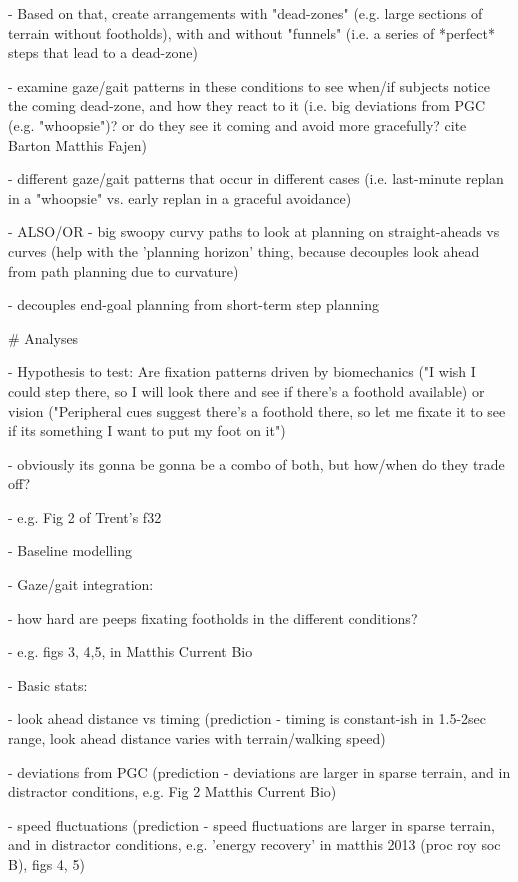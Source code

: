   - Based on that, create arrangements with "dead-zones" (e.g. large sections of terrain without footholds), with and without "funnels" (i.e. a series of *perfect* steps that lead to a dead-zone)
  
    - examine gaze/gait patterns in these conditions to see when/if subjects notice the coming dead-zone, and how they react to it (i.e. big deviations from PGC (e.g. "whoopsie")? or do they see it coming and avoid more gracefully? cite Barton Matthis Fajen)
    
    - different gaze/gait patterns that occur in different cases (i.e. last-minute replan in a "whoopsie" vs. early replan in a graceful avoidance)
  
  - ALSO/OR - big swoopy curvy paths to look at planning on straight-aheads vs curves (help with the 'planning horizon' thing, because decouples look ahead from path planning due to curvature)
  
    - decouples end-goal planning from short-term step planning


# Analyses

- Hypothesis to test: Are fixation patterns driven by biomechanics ("I wish I could step there, so I will look there and see if there's a foothold available) or vision ("Peripheral cues suggest there's a foothold there, so let me fixate it to see if its something I want to put my foot on it")

    - obviously its gonna be gonna be a combo of both, but how/when do they trade off? 
  
    - e.g. Fig 2 of Trent's f32

- Baseline modelling

  - Gaze/gait integration:
  
    - how hard are peeps fixating footholds in the different conditions?
    
        - e.g. figs 3, 4,5, in Matthis Current Bio

  - Basic stats:
  
    - look ahead distance vs timing (prediction - timing is constant-ish in 1.5-2sec range, look ahead distance varies with terrain/walking speed)
    
    - deviations from PGC (prediction - deviations are larger in sparse terrain, and in distractor conditions, e.g. Fig 2 Matthis Current Bio)
    
    - speed fluctuations (prediction - speed fluctuations are larger in sparse terrain, and in distractor conditions, e.g. 'energy recovery' in matthis 2013 (proc roy soc B), figs 4, 5)
    
